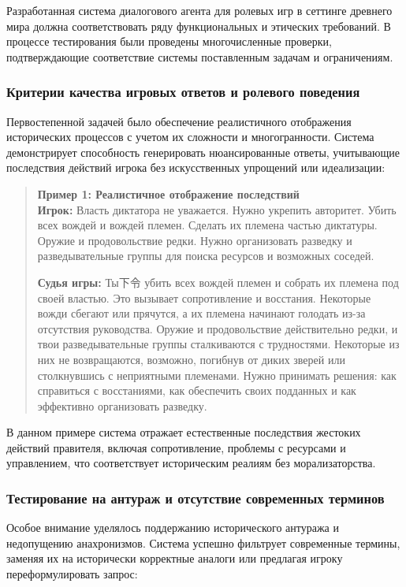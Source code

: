 Разработанная система диалогового агента для ролевых игр в сеттинге древнего мира должна соответствовать ряду функциональных и этических требований. В процессе тестирования были проведены многочисленные проверки, подтверждающие соответствие системы поставленным задачам и ограничениям.

\subsubsection{Критерии качества игровых ответов и ролевого поведения}

Первостепенной задачей было обеспечение реалистичного отображения исторических процессов с учетом их сложности и многогранности. Система демонстрирует способность генерировать нюансированные ответы, учитывающие последствия действий игрока без искусственных упрощений или идеализации:

\begin{quote}
\textbf{Пример 1: Реалистичное отображение последствий}\\
\textbf{Игрок:} Власть диктатора не уважается. Нужно укрепить авторитет. Убить всех вождей и вождей племен. Сделать их племена частью диктатуры. Оружие и продовольствие редки. Нужно организовать разведку и разведывательные группы для поиска ресурсов и возможных соседей.

\textbf{Судья игры:} Ты下令 убить всех вождей племен и собрать их племена под своей властью. Это вызывает сопротивление и восстания. Некоторые вожди сбегают или прячутся, а их племена начинают голодать из-за отсутствия руководства. Оружие и продовольствие действительно редки, и твои разведывательные группы сталкиваются с трудностями. Некоторые из них не возвращаются, возможно, погибнув от диких зверей или столкнувшись с неприятными племенами. Нужно принимать решения: как справиться с восстаниями, как обеспечить своих подданных и как эффективно организовать разведку.
\end{quote}

В данном примере система отражает естественные последствия жестоких действий правителя, включая сопротивление, проблемы с ресурсами и управлением, что соответствует историческим реалиям без морализаторства.

\subsubsection{Тестирование на антураж и отсутствие современных терминов}

Особое внимание уделялось поддержанию исторического антуража и недопущению анахронизмов. Система успешно фильтрует современные термины, заменяя их на исторически корректные аналоги или предлагая игроку переформулировать запрос:

